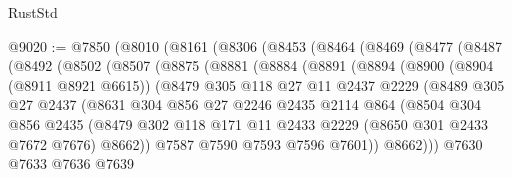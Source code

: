 \begin{lexlean}{RustStd}
\begin{coremodule}
{\begin{coremodule}
{{{{{{{{{{{{{{{{{{{{{{{{{{@9020 := @7850
    (@8010
      (@8161
        (@8306
          (@8453
            (@8464
              (@8469
                (@8477
                  (@8487
                    (@8492
                      (@8502
                        (@8507
                          (@8875
                            (@8881
                              (@8884
                                (@8891
                                  (@8894
                                    (@8900
                                      (@8904 (@8911 @8921 @6615))
                                      (@8479
                                        @305
                                        @118
                                        @27
                                        @11
                                        @2437
                                        @2229
                                        (@8489
                                          @305
                                          @27
                                          @2437
                                          (@8631
                                            @304
                                            @856
                                            @27
                                            @2246
                                            @2435
                                            @2114
                                            @864
                                            (@8504
                                              @304
                                              @856
                                              @2435
                                              (@8479
                                                @302
                                                @118
                                                @171
                                                @11
                                                @2433
                                                @2229
                                                (@8650 @301 @2433 @7672 @7676)
                                                @8662))
                                            @7587
                                            @7590
                                            @7593
                                            @7596
                                            @7601))
                                        @8662)))
                                  @7630
                                  @7633
                                  @7636
                                  @7639
}}}}}}}}}}}}}}}}}}}}}}}}}}
\end{coremodule}}
\end{coremodule}
\end{lexlean}
